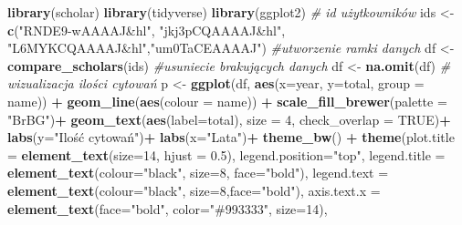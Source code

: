 \documentclass[
  12pt,
]{article}
\newenvironment{Shaded}{\begin{snugshade}}{\end{snugshade}}
\newcommand{\AttributeTok}[1]{\textcolor[rgb]{0.13,0.29,0.53}{#1}}
\newcommand{\CommentTok}[1]{\textcolor[rgb]{0.56,0.35,0.01}{\textit{#1}}}
\newcommand{\ConstantTok}[1]{\textcolor[rgb]{0.56,0.35,0.01}{#1}}
\newcommand{\DecValTok}[1]{\textcolor[rgb]{0.00,0.00,0.81}{#1}}
\newcommand{\FloatTok}[1]{\textcolor[rgb]{0.00,0.00,0.81}{#1}}
\newcommand{\FunctionTok}[1]{\textcolor[rgb]{0.13,0.29,0.53}{\textbf{#1}}}
\newcommand{\NormalTok}[1]{#1}
\newcommand{\OtherTok}[1]{\textcolor[rgb]{0.56,0.35,0.01}{#1}}
\newcommand{\SpecialCharTok}[1]{\textcolor[rgb]{0.81,0.36,0.00}{\textbf{#1}}}
\newcommand{\StringTok}[1]{\textcolor[rgb]{0.31,0.60,0.02}{#1}}
\begin{document}
\begin{Shaded}
\begin{Highlighting}[]
\FunctionTok{library}\NormalTok{(scholar)}
\FunctionTok{library}\NormalTok{(tidyverse)}
\FunctionTok{library}\NormalTok{(ggplot2)}
\CommentTok{\# id  użytkowników}
\NormalTok{ids }\OtherTok{\textless{}{-}} \FunctionTok{c}\NormalTok{(}\StringTok{"RNDE9{-}wAAAAJ\&hl"}\NormalTok{, }\StringTok{"jkj3pCQAAAAJ\&hl"}\NormalTok{,}
         \StringTok{"L6MYKCQAAAAJ\&hl"}\NormalTok{,}\StringTok{"um0TaCEAAAAJ"}\NormalTok{)}
\CommentTok{\#utworzenie ramki danych}
\NormalTok{df }\OtherTok{\textless{}{-}} \FunctionTok{compare\_scholars}\NormalTok{(ids)}
\CommentTok{\#usuniecie brakujących danych}
\NormalTok{df }\OtherTok{\textless{}{-}} \FunctionTok{na.omit}\NormalTok{(df)}
\CommentTok{\# wizualizacja ilości cytowań}
\NormalTok{p }\OtherTok{\textless{}{-}} \FunctionTok{ggplot}\NormalTok{(df, }\FunctionTok{aes}\NormalTok{(}\AttributeTok{x=}\NormalTok{year, }\AttributeTok{y=}\NormalTok{total, }\AttributeTok{group =}\NormalTok{ name)) }\SpecialCharTok{+}
  \FunctionTok{geom\_line}\NormalTok{(}\FunctionTok{aes}\NormalTok{(}\AttributeTok{colour =}\NormalTok{ name)) }\SpecialCharTok{+}
  \FunctionTok{scale\_fill\_brewer}\NormalTok{(}\AttributeTok{palette =} \StringTok{"BrBG"}\NormalTok{)}\SpecialCharTok{+}
  \FunctionTok{geom\_text}\NormalTok{(}\FunctionTok{aes}\NormalTok{(}\AttributeTok{label=}\NormalTok{total), }\AttributeTok{size =} \DecValTok{4}\NormalTok{, }\AttributeTok{check\_overlap =} \ConstantTok{TRUE}\NormalTok{)}\SpecialCharTok{+}
  \FunctionTok{labs}\NormalTok{(}\AttributeTok{y=}\StringTok{"Ilość cytowań"}\NormalTok{)}\SpecialCharTok{+}
  \FunctionTok{labs}\NormalTok{(}\AttributeTok{x=}\StringTok{"Lata"}\NormalTok{)}\SpecialCharTok{+}
  \FunctionTok{theme\_bw}\NormalTok{() }\SpecialCharTok{+}
  \FunctionTok{theme}\NormalTok{(}\AttributeTok{plot.title =} \FunctionTok{element\_text}\NormalTok{(}\AttributeTok{size=}\DecValTok{14}\NormalTok{, }\AttributeTok{hjust =} \FloatTok{0.5}\NormalTok{),}
   \AttributeTok{legend.position=}\StringTok{"top"}\NormalTok{,}
   \AttributeTok{legend.title =} \FunctionTok{element\_text}\NormalTok{(}\AttributeTok{colour=}\StringTok{"black"}\NormalTok{, }\AttributeTok{size=}\DecValTok{8}\NormalTok{, }\AttributeTok{face=}\StringTok{"bold"}\NormalTok{),}
   \AttributeTok{legend.text =} \FunctionTok{element\_text}\NormalTok{(}\AttributeTok{colour=}\StringTok{"black"}\NormalTok{, }\AttributeTok{size=}\DecValTok{8}\NormalTok{,}\AttributeTok{face=}\StringTok{"bold"}\NormalTok{),}
   \AttributeTok{axis.text.x =} \FunctionTok{element\_text}\NormalTok{(}\AttributeTok{face=}\StringTok{"bold"}\NormalTok{, }\AttributeTok{color=}\StringTok{"\#993333"}\NormalTok{, }\AttributeTok{size=}\DecValTok{14}\NormalTok{),}

\end{Highlighting}
\end{Shaded}
\end{document}
